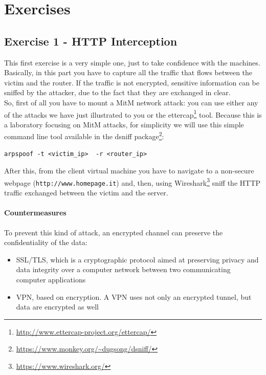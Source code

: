 \documentclass[draft]{article}
\begin{document}
\section{Exercises}

\subsection{Exercise 1 - HTTP Interception}
This first exercise is a very simple one, just to take confidence with the machines.
Basically, in this part you have to capture all the traffic that flows between the victim and the router.
If the traffic is not encrypted, sensitive information can be sniffed by the attacker,
due to the fact that they are exchanged in clear. \\
So, first of all you have to mount a \ac{MitM} network attack:
you can use either any of the attacks we have just illustrated to you or the ettercap\footnote{\url{http://www.ettercap-project.org/ettercap/}} tool.
Because this is a laboratory focusing on \ac{MitM} attacks, for simplicity we will use this simple command line tool available in the dsniff package\footnote{\url{https://www.monkey.org/~dugsong/dsniff/}}:
\begin{lstlisting}
arpspoof -t <victim_ip>  -r <router_ip>
\end{lstlisting}
After this, from the client virtual machine you have to navigate to a non-secure webpage (\texttt{http://www.homepage.it})
and, then, using Wireshark\footnote{\url{https://www.wireshark.org/}} sniff the HTTP traffic exchanged between the victim and the server.
\paragraph{Countermeasures}
To prevent this kind of attack, an encrypted channel can preserve the confidentiality of the data:
\begin{itemize}
  \item SSL/TLS, which is a cryptographic protocol aimed at preserving privacy and data integrity over a computer network between two communicating computer applications
  \item VPN, based on encryption. A VPN uses not only an encrypted tunnel, but data are encrypted as well 
\end{itemize}
\newpage
\end{document}
